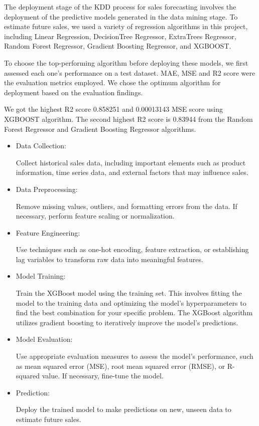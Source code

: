 	The deployment stage of the KDD process for sales forecasting involves the deployment of the predictive models generated in the data mining stage. To estimate future sales, we used a variety of regression algorithms in this project, including Linear Regression, DecisionTree Regressor, ExtraTrees Regressor, Random Forest Regressor, Gradient Boosting Regressor, and XGBOOST.\bigskip
	
	To choose the top-performing algorithm before deploying these models, we first assessed each one's performance on a test dataset. \ac{MAE}, \ac{MSE} and \ac{R2} score were the evaluation metrics employed. We chose the optimum algorithm for deployment based on the evaluation findings.\bigskip
	
	We got the highest R2 score 0.858251 and 0.00013143 MSE score using XGBOOST algorithm. The second highest R2 score is 0.83944 from the Random Forest Regressor and Gradient Boosting Regressor algorithms.

\begin{itemize}
	
	\item Data Collection: 
	
	Collect historical sales data, including important elements such as product information, time series data, and external factors that may influence sales.
	
	\item Data Preprocessing: 
	
	Remove missing values, outliers, and formatting errors from the data. If necessary, perform feature scaling or normalization.
	
	\item Feature Engineering: 
	
	Use techniques such as one-hot encoding, feature extraction, or establishing lag variables to transform raw data into meaningful features.
	
	\item Model Training: 
	
	Train the XGBoost model using the training set. This involves fitting the model to the training data and optimizing the model's hyperparameters to find the best combination for your specific problem. The XGBoost algorithm utilizes gradient boosting to iteratively improve the model's predictions.
	
	\item Model Evaluation: 
	
	Use appropriate evaluation measures to assess the model's performance, such as mean squared error (MSE), root mean squared error (RMSE), or R-squared value. If necessary, fine-tune the model.
	
	\item Prediction: 
	
	Deploy the trained model to make predictions on new, unseen data to estimate future sales.
	
\end{itemize}

